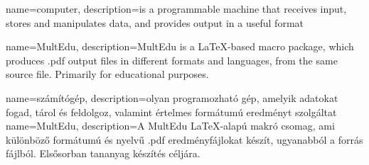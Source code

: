 
  {
	{
		name={computer},
		description={is a programmable machine that receives input,
			stores and manipulates data, and provides
			output in a useful format}
	}
	
	{
		name={MultEdu},
		description={MultEdu is a \LaTeX{}-based macro package, which produces .pdf output files in different formats and languages, from the same source file. Primarily for educational purposes.}
	}

 }	
 {}
  {%
	{
		name={számítógép},
		description={olyan programozható gép, amelyik adatokat
		fogad, tárol és feldolgoz, valamint értelmes formátumú eredményt szolgáltat}
	}
	{
		name={MultEdu},
		description={A MultEdu  \LaTeX{}-alapú makró csomag, ami különböző formátumú és nyelvű .pdf eredményfájlokat készít, ugyanabból a forrás fájlból. Elsősorban tananyag készítés céljára.}
	}
  }
{
}